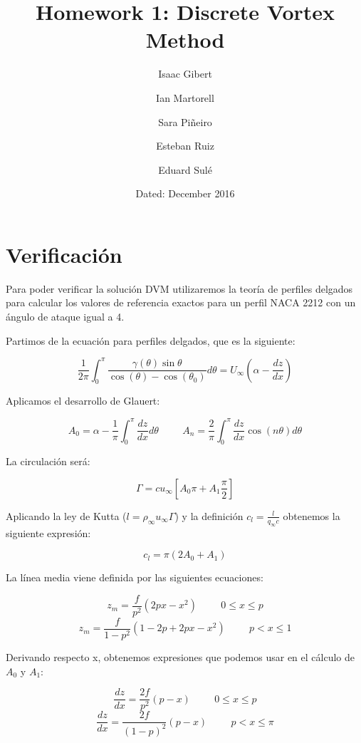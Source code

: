 \documentclass[10pt, a4paper]{article}
\begin{document}
\author{Isaac Gibert}
\author{Ian Martorell}
\author{Sara Piñeiro}
\author{Esteban Ruiz}
\author{Eduard Sulé}
\title{Homework 1: Discrete Vortex Method}
\date{Dated: December 2016}
\maketitle

\section{Verificación}

Para poder verificar la solución DVM utilizaremos la teoría de perfiles delgados para calcular los valores de referencia exactos para un perfil NACA 2212 con un ángulo de ataque igual a 4\textdegree .

Partimos de la ecuación para perfiles delgados, que es la siguiente:

\[ \frac{1}{2\pi}\int^\pi_0 \frac{\gamma(\theta)\sin\theta}{\cos(\theta)-\cos(\theta_0)}d\theta = U_\infty(\alpha-\frac{dz}{dx}) \]

Aplicamos el desarrollo de Glauert:

\[ A_0 = \alpha - \frac{1}{\pi} \int^\pi_0 \frac{dz}{dx} d\theta \hspace{1cm} A_n = \frac{2}{\pi} \int^\pi_0 \frac{dz}{dx} \cos(n\theta)d\theta \]

La circulación será:

\[ \Gamma = cu_\infty[A_0\pi + A_1\frac{\pi}{2}] \]

Aplicando la ley de Kutta ($l = \rho_\infty u_\infty \Gamma$) y la definición $c_l=\frac{l}{q_\infty c}$ obtenemos la siguiente expresión:

\[ c_l = \pi (2 A_0 + A_1) \]

La línea media viene definida por las siguientes ecuaciones:

\[ z_m = \frac{f}{p^2} (2px - x^2) \hspace{1cm} 0 \leq x \leq p \]
\[ z_m = \frac{f}{1-p^2} (1-2p+2px-x^2) \hspace{1cm} p < x \leq 1 \]

Derivando respecto x, obtenemos expresiones que podemos usar en el cálculo de $A_0$ y $A_1$:

\[ \frac{dz}{dx} = \frac{2f}{p^2}(p-x) \hspace{1cm} 0 \leq x \leq p \]
\[ \frac{dz}{dx} = \frac{2f}{(1-p)^2}(p-x) \hspace{1cm} p < x \leq \pi \]
\end{document}
